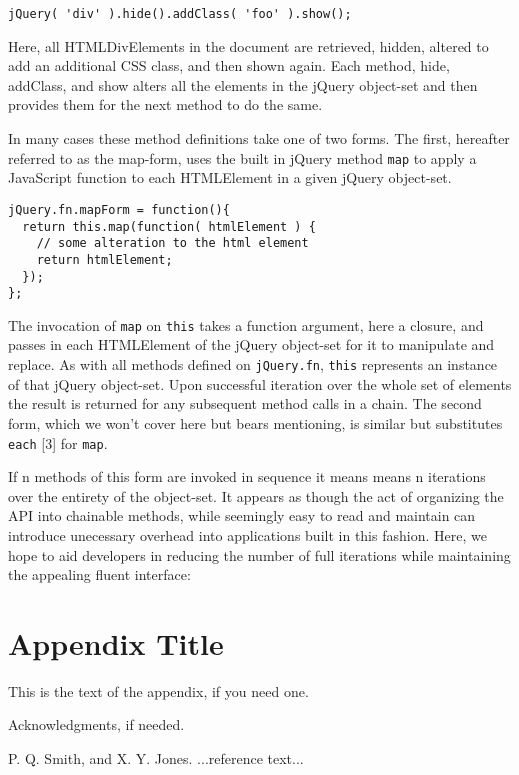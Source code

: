 \documentclass[preprint]{sigplanconf}
\begin{document}
\begin{verbatim}
jQuery( 'div' ).hide().addClass( 'foo' ).show();
\end{verbatim}

Here, all HTMLDivElements in the document are retrieved, hidden, altered to add an additional CSS class, and then shown again. Each method, hide, addClass, and show alters all the elements in the jQuery object-set and then provides them for the next method to do the same.

In many cases these method definitions take one of two forms. The first, hereafter referred to as the map-form, uses the built in jQuery method \verb|map| to apply a JavaScript function to each HTMLElement in a given jQuery object-set.

\begin{verbatim}
jQuery.fn.mapForm = function(){
  return this.map(function( htmlElement ) {
    // some alteration to the html element
    return htmlElement;
  });
};
\end{verbatim}

The invocation of \verb|map| on \verb|this| takes a function argument, here a closure, and passes in each HTMLElement of the jQuery object-set for it to manipulate and replace. As with all methods defined on \verb|jQuery.fn|, \verb|this| represents an instance of that jQuery object-set. Upon successful iteration over the whole set of elements the result is returned for any subsequent method calls in a chain. The second form, which we won't cover here but bears mentioning, is similar but substitutes \verb|each| [3] for \verb|map|.

If n methods of this form are invoked in sequence it means means n iterations over the entirety of the object-set. It appears as though the act of organizing the API into chainable methods, while seemingly easy to read and maintain can introduce unecessary overhead into applications built in this fashion. Here, we hope to aid developers in reducing the number of full iterations while maintaining the appealing fluent interface:


\appendix
\section{Appendix Title}

This is the text of the appendix, if you need one.

\acks

Acknowledgments, if needed.





\begin{thebibliography}{}
\softraggedright

P. Q. Smith, and X. Y. Jones. ...reference text...

\end{thebibliography}
\end{document}
